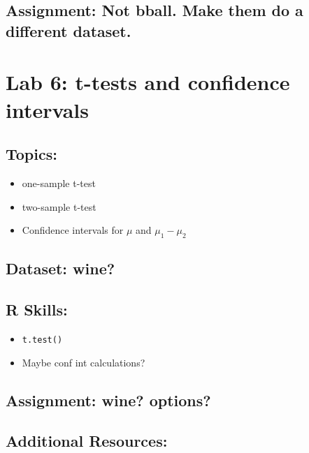 \documentclass[]{article}
\providecommand{\tightlist}{%
  \setlength{\itemsep}{0pt}\setlength{\parskip}{0pt}}
\begin{document}
\subsection{Assignment: Not bball. Make them do a different
dataset.}\label{assignment-not-bball.-make-them-do-a-different-dataset.}

\section{Lab 6: t-tests and confidence
intervals}\label{lab-6-t-tests-and-confidence-intervals}

\subsection{Topics:}\label{topics-5}

\begin{itemize}
\tightlist
\item
  one-sample t-test
\item
  two-sample t-test
\item
  Confidence intervals for \(\mu\) and \(\mu_1 - \mu_2\)
\end{itemize}

\subsection{Dataset: wine?}\label{dataset-wine}

\subsection{R Skills:}\label{r-skills-4}

\begin{itemize}
\tightlist
\item
  \texttt{t.test()}
\item
  Maybe conf int calculations?
\end{itemize}

\subsection{Assignment: wine? options?}\label{assignment-wine-options}

\subsection{Additional Resources:}\label{additional-resources-4}
\end{document}
